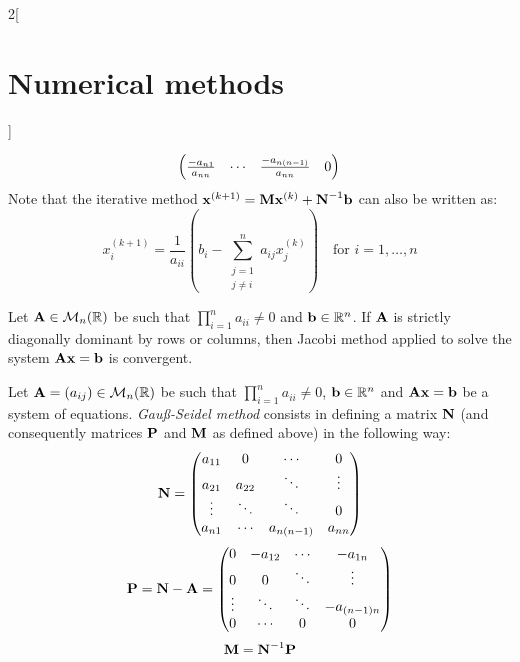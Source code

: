 \documentclass[../../../main_math.tex]{subfiles}
\begin{document}
\begin{multicols}{2}[\section{Numerical methods}]
\begin{definition}
\begin{equation*}
\begin{pmatrix}
        \frac{-a_{n1}}{a_{nn}} & \cdots                 & \frac{-a_{n(n-1)}}{a_{nn}} & 0
      \end{pmatrix}\\
    \end{equation*}
    Note that the iterative method $\boldsymbol{\mathrm{x}}^{(k+1)}=\boldsymbol{\mathrm{M}}\boldsymbol{\mathrm{x}}^{(k)}+\boldsymbol{\mathrm{N}}^{-1}\boldsymbol{\mathrm{b}}$ can also be written as: $$x_i^{(k+1)}=\frac{1}{a_{ii}}\left(b_i-\sum_{\substack{j=1\\j\ne i}}^na_{ij}x_j^{(k)}\right)\quad\text{for }i=1,\ldots,n$$
  \end{definition}
  \begin{theorem}
    Let $\boldsymbol{\mathrm{A}}\in\mathcal{M}_n(\mathbb{R})$ be such that $\prod_{i=1}^na_{ii}\ne 0$ and $\boldsymbol{\mathrm{b}}\in\mathbb{R}^n$. If $\boldsymbol{\mathrm{A}}$ is strictly diagonally dominant by rows or columns, then Jacobi method applied to solve the system $\boldsymbol{\mathrm{A}}\boldsymbol{\mathrm{x}}=\boldsymbol{\mathrm{b}}$ is convergent.
  \end{theorem}
  \begin{definition}
    Let $\boldsymbol{\mathrm{A}}=(a_{ij})\in\mathcal{M}_n(\mathbb{R})$ be such that $\prod_{i=1}^na_{ii}\ne 0$, $\boldsymbol{\mathrm{b}}\in\mathbb{R}^n$ and $\boldsymbol{\mathrm{A}}\boldsymbol{\mathrm{x}}=\boldsymbol{\mathrm{b}}$ be a system of equations. \emph{Gau\ss-Seidel method} consists in defining a matrix $\boldsymbol{\mathrm{N}}$ (and consequently matrices $\boldsymbol{\mathrm{P}}$ and $\boldsymbol{\mathrm{M}}$ as defined above) in the following way:
    \begin{equation*}
      \boldsymbol{\mathrm{N}}=
      \begin{pmatrix}
        a_{11} & 0      & \cdots     & 0      \\
        a_{21} & a_{22} & \ddots     & \vdots \\
        \vdots & \ddots & \ddots     & 0      \\
        a_{n1} & \cdots & a_{n(n-1)} & a_{nn}
      \end{pmatrix}
    \end{equation*}
    \begin{equation*}
      \boldsymbol{\mathrm{P}}=\boldsymbol{\mathrm{N}}-\boldsymbol{\mathrm{A}}=
      \begin{pmatrix}
        0      & -a_{12} & \cdots & -a_{1n}     \\
        0      & 0       & \ddots & \vdots      \\
        \vdots & \ddots  & \ddots & -a_{(n-1)n} \\
        0      & \cdots  & 0      & 0
      \end{pmatrix}
    \end{equation*}
    \begin{equation*}
      \boldsymbol{\mathrm{M}}=\boldsymbol{\mathrm{N}}^{-1}\boldsymbol{\mathrm{P}}
    \end{equation*}

\end{definition}
\end{multicols}
\end{document}
